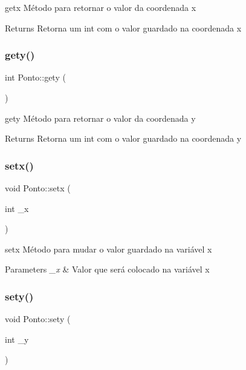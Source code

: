 getx Método para retornar o valor da coordenada x 

\begin{DoxyReturn}{Returns}
Retorna um int com o valor guardado na coordenada x 
\end{DoxyReturn}
\mbox{\label{class_ponto_a383a1698d34a2bc2cc84293e951d0f3b}} 
\subsubsection{\texorpdfstring{gety()}{gety()}}
{\footnotesize\ttfamily int Ponto\+::gety (\begin{DoxyParamCaption}{ }\end{DoxyParamCaption})}



gety Método para retornar o valor da coordenada y 

\begin{DoxyReturn}{Returns}
Retorna um int com o valor guardado na coordenada y 
\end{DoxyReturn}
\mbox{\label{class_ponto_ab49e43abd7833943dc2caaa6dff012c2}} 
\subsubsection{\texorpdfstring{setx()}{setx()}}
{\footnotesize\ttfamily void Ponto\+::setx (\begin{DoxyParamCaption}\item[{int}]{\+\_\+x }\end{DoxyParamCaption})}



setx Método para mudar o valor guardado na variável x 


\begin{DoxyParams}{Parameters}
{\em \+\_\+x} & Valor que será colocado na variável x \\
\hline
\end{DoxyParams}
\mbox{\label{class_ponto_a13ea5b12596fc0b8b725115d56404e20}} 
\subsubsection{\texorpdfstring{sety()}{sety()}}
{\footnotesize\ttfamily void Ponto\+::sety (\begin{DoxyParamCaption}\item[{int}]{\+\_\+y }\end{DoxyParamCaption})}



